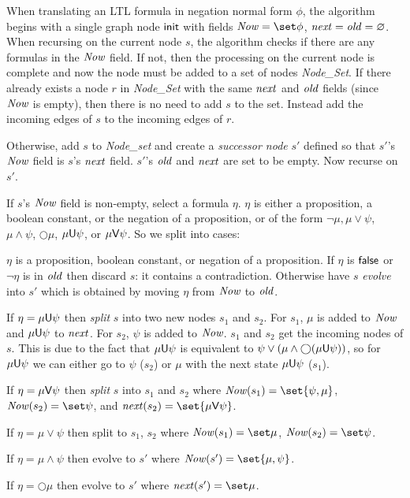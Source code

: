 \def\now{{\it Now}}\def\old{{\it old}}\def\next{{\it next}}
When translating an LTL formula in negation normal form $\phi$, the algorithm begins with a single graph node ${\sf init}$ with fields $\now=\set\phi$, $\next=\old=\varnothing$.
When recursing on the current node $s$, the algorithm checks if there are any formulas in the $\now$ field.
If not, then the processing on the current node is complete and now the node must be added to a set of nodes {\it Node\_Set}.
If there already exists a node $r$ in {\it Node\_Set} with the same $\next$ and $\old$ fields (since $\now$ is empty), then there is no need to add $s$ to the set.
Instead add the incoming edges of $s$ to the incoming edges of $r$.

Otherwise, add $s$ to {\it Node\_set} and create a {\it successor node} $s'$ defined so that $s'$'s $\now$ field is $s$'s $\next$ field.
$s'$'s $\old$ and $\next$ are set to be empty.
Now recurse on $s'$.

If $s$'s $\now$ field is non-empty, select a formula $\eta$.
$\eta$ is either a proposition, a boolean constant, or the negation of a proposition, or of the form $\neg\mu,\mu\lor\psi$, $\mu\land\psi$, $\bigcirc\mu$, $\mu{\sf U}\psi$, or $\mu{\sf V}\psi$.
So we split into cases:
\benum
    \item $\eta$ is a proposition, boolean constant, or negation of a proposition.
        If $\eta$ is ${\sf false}$ or $\neg\eta$ is in $\old$ then discard $s$: it contains a contradiction.
        Otherwise have $s$ {\it evolve} into $s'$ which is obtained by moving $\eta$ from $\now$ to $\old$.
    \item If $\eta=\mu{\sf U}\psi$ then {\it split} $s$ into two new nodes $s_1$ and $s_2$.
        For $s_1$, $\mu$ is added to $\now$ and $\mu{\sf U}\psi$ to $\next$.
        For $s_2$, $\psi$ is added to $\now$.
        $s_1$ and $s_2$ get the incoming nodes of $s$.
        This is due to the fact that $\mu{\sf U}\psi$ is equivalent to $\psi\lor(\mu\land\bigcirc(\mu{\sf U}\psi))$, so for $\mu{\sf U}\psi$ we can either go to $\psi$ ($s_2$) or $\mu$ with the next state $\mu{\sf U}\psi$
        ($s_1$).
    \item If $\eta=\mu{\sf V}\psi$ then {\it split} $s$ into $s_1$ and $s_2$ where $\now(s_1)=\set{\psi,\mu}$, $\now(s_2)=\set\psi$, and $\next(s_2)=\set{\mu\V\psi}$.
    \item If $\eta=\mu\lor\psi$ then split to $s_1$, $s_2$ where $\now(s_1)=\set\mu$, $\now(s_2)=\set\psi$.
    \item If $\eta=\mu\land\psi$ then evolve to $s'$ where $\now(s')=\set{\mu,\psi}$.
    \item If $\eta=\bigcirc\mu$ then evolve to $s'$ where $\next(s')=\set\mu$.
\eenum


